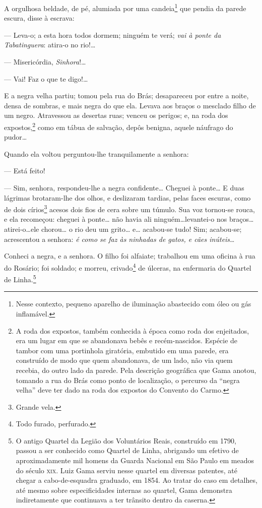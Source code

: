 A orgulhosa beldade, de pé, alumiada por uma candeia\footnote{Nesse
  contexto, pequeno aparelho de iluminação abastecido com óleo ou gás
  inflamável.} que pendia da parede escura, disse à escrava:

  --- Leva-o; a esta hora todos dormem; ninguém te verá; \emph{vai à
  ponte da Tabatinguera}: atira-o no rio!\ldots{}

  --- Misericórdia, \emph{Sinhora}!\ldots{}

  --- Vai! Faz o que te digo!\ldots{}

E a negra velha partiu; tomou pela rua do Brás; desapareceu por entre a
noite, densa de sombras, e mais negra do que ela. Levava aos braços o
mesclado filho de um negro. Atravessou as desertas ruas; venceu os
perigos; e, na roda dos expostos,\footnote{A roda dos expostos, também
  conhecida à época como roda dos enjeitados, era um lugar em que se
  abandonava bebês e recém-nascidos. Espécie de tambor com uma
  portinhola giratória, embutido em uma parede, era construído de modo
  que quem abandonava, de um lado, não via quem recebia, do outro lado
  da parede. Pela descrição geográfica que Gama anotou, tomando a rua do
  Brás como ponto de localização, o percurso da ``negra velha'' deve ter
  dado na roda dos expostos do Convento do Carmo.} como em tábua de
salvação, depôs benigna, aquele náufrago do pudor\ldots{}

  Quando ela voltou perguntou-lhe tranquilamente a senhora:

  --- Está feito! %

--- Sim, senhora, respondeu-lhe a negra confidente\ldots{} Cheguei à
ponte\ldots{} E duas lágrimas brotaram-lhe dos olhos, e deslizaram tardias,
pelas faces escuras, como de dois círios\footnote{Grande vela.} acesos
dois fios de cera sobre um túmulo. Sua voz tornou-se rouca, e ela
recomeçou: cheguei à ponte\ldots{} não havia ali ninguém\ldots{}levantei-o nos
braços\ldots{}atirei-o\ldots{}ele chorou\ldots{} o rio deu um grito\ldots{} e\ldots{} acabou-se
tudo! Sim; acabou-se; acrescentou a senhora: \emph{é como se faz às
ninhadas de gatos, e cães inúteis}\ldots{}

Conheci a negra, e a senhora. O filho foi alfaiate; trabalhou em uma
oficina à rua do Rosário; foi soldado; e morreu, crivado\footnote{Todo
  furado, perfurado.} de úlceras, na enfermaria do Quartel de
Linha.\footnote{O antigo Quartel da Legião dos Voluntários Reais,
  construído em 1790, passou a ser conhecido como Quartel de Linha,
  abrigando um efetivo de aproximadamente mil homens da Guarda Nacional
  em São Paulo em meados do século \textsc{xix}. Luiz Gama serviu nesse quartel
  em diversas patentes, até chegar a cabo-de-esquadra graduado, em 1854.
  Ao tratar do caso em detalhes, até mesmo sobre especificidades
  internas ao quartel, Gama demonstra indiretamente que continuava a ter
  trânsito dentro da caserna.}

